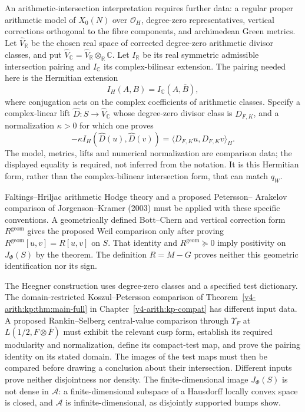 An arithmetic-intersection interpretation requires further data:
a regular proper arithmetic model of $X_0(N)$ over $\mathcal O_H$,
degree-zero representatives, vertical corrections orthogonal to the
fibre components, and archimedean Green metrics. Let $\widehat V_{\mathbb R}$
be the chosen real space of corrected degree-zero arithmetic divisor classes,
and put $\widehat V_{\mathbb C}=\widehat V_{\mathbb R}\otimes_{\mathbb R}\mathbb C$.
Let $I_{\mathbb R}$ be its real symmetric admissible intersection pairing
and $I_{\mathbb C}$ its complex-bilinear extension. The pairing needed
here is the Hermitian extension
\[
 I_H(A,B)=I_{\mathbb C}(A,\overline B),
\]
where conjugation acts on the complex coefficients of arithmetic
classes. Specify a complex-linear lift $\widehat D:S\to\widehat V_{\mathbb C}$
whose degree-zero divisor class is $D_{F,K}$, and a normalization
$\kappa>0$ for which one proves
\[
 -\kappa I_H(\widehat D(u),\widehat D(v))
       =\langle D_{F,K}u,D_{F,K}v\rangle_H.
\]
The model, metrics, lifts and numerical
normalization are comparison data; the displayed equality is required,
not inferred from the notation. It is this Hermitian form, rather than
the complex-bilinear intersection form, that can match $q_W$.

Faltings--Hriljac arithmetic Hodge theory and a proposed Petersson--
Arakelov comparison of Jorgenson--Kramer (2003) must be applied with
these specific conventions. A geometrically defined Bott--Chern and
vertical correction form $R^{\mathrm{geom}}$ gives the proposed Weil
comparison only after proving $R^{\mathrm{geom}}[u,v]=R[u,v]$ on $S$.
That identity and $R^{\mathrm{geom}}\succeq0$ imply positivity on
$J_\Phi(S)$ by the theorem. The definition $R=M-G$ proves neither
this geometric identification nor its sign.

\begin{remark}
\label{v4-arith:w8-atp:rem:heeg-distinct}
The Heegner construction uses degree-zero classes and a specified test
dictionary. The domain-restricted Koszul--Petersson comparison of
Theorem~\ref{v4-arith:kp:thm:main-full} in
Chapter~\ref{v4-arith:kp-compat} has different input data.
A proposed Rankin--Selberg central-value comparison through $\Upsilon_F$
at $L(1/2,F\otimes\bar F)$ must exhibit the relevant cusp form,
establish its required modularity and normalization, define its
compact-test map, and prove the pairing identity on its stated domain.
The images of the test maps must then be compared before drawing a
conclusion about their intersection.
Different inputs prove neither disjointness nor density.
The finite-dimensional image $J_\Phi(S)$ is not dense in $\mathscr A$:
a finite-dimensional subspace of a Hausdorff locally convex space is
closed, and $\mathscr A$ is infinite-dimensional, as disjointly
supported bumps show.
\end{remark}

